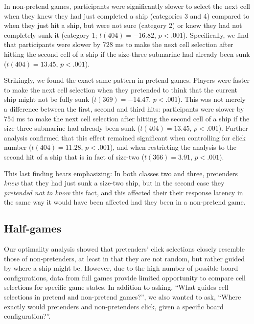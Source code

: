 \documentclass[10pt, letterpaper]{article}
\begin{document}
In non-pretend games, participants were significantly slower to select
the next cell when they knew they had just completed a ship (categories
3 and 4) compared to when they just hit a ship, but were not sure
(category 2) or knew they had not completely sunk it (category 1;
\(t(404) = -16.82\), \(p < .001\)). Specifically, we find that
participants were slower by 728 ms to make the next cell selection after
hitting the second cell of a ship if the size-three submarine had
already been sunk (\(t(404) = 13.45\), \(p < .001\)).

Strikingly, we found the exact same pattern in pretend games. Players
were faster to make the next cell selection when they pretended to think
that the current ship might not be fully sunk (\(t(369) = -14.47\),
\(p < .001\)). This was not merely a difference between the first,
second and third hits: participants were slower by 754 ms to make the
next cell selection after hitting the second cell of a ship if the
size-three submarine had already been sunk (\(t(404) = 13.45\),
\(p < .001\)). Further analysis confirmed that this effect remained
significant when controlling for click number (\(t(404) = 11.28\),
\(p < .001\)), and when restricting the analysis to the second hit of a
ship that is in fact of size-two (\(t(366) = 3.91\), \(p < .001\)).

This last finding bears emphasizing: In both classes two and three,
pretenders \emph{knew} that they had just sunk a size-two ship, but in
the second case they \emph{pretended not to know} this fact, and this
affected their their response latency in the same way it would have been
affected had they been in a non-pretend game.

\hypertarget{half-games-1}{%
\subsection{Half-games}\label{half-games-1}}

Our optimality analysis showed that pretenders' click selections closely
resemble those of non-pretenders, at least in that they are not random,
but rather guided by where a ship might be. However, due to the high
number of possible board configurations, data from full games provide
limited opportunity to compare cell selections for specific game states.
In addition to asking, ``What guides cell selections in pretend and
non-pretend games?'', we also wanted to ask, ``Where exactly would
pretenders and non-pretenders click, given a specific board
configuration?''.
\end{document}
